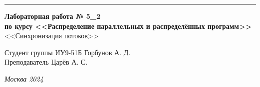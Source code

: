\documentclass[a4paper, 14pt]{extarticle}
\begin{document}
\begin{titlepage}
\vspace*{-16pt}
\hspace{30pt}\rule{0.866\textwidth}{0.4pt}
  
\vspace{11em}

\begin{center}
\Large {\bf Лабораторная работа № 5\_2} \\ 
\large {\bf по курсу <<Распределение параллельных и распределённых программ>>}\\
\large <<Синхронизация потоков>>
\end{center}\normalsize

\vspace{8em}


\begin{flushright}
  {Студент группы ИУ9-51Б Горбунов А. Д.\hspace*{15pt} \\
  \vspace{2ex}
  Преподаватель Царёв А. С.\hspace*{15pt}}
\end{flushright}

\bigskip

\vfill
 

\begin{center}
\textsl{Москва 2024}
\end{center}
\end{titlepage}

\renewcommand{\ttdefault}{pcr}

\setlength{\tabcolsep}{3pt}
\newpage
\setcounter{page}{2}
\end{document}
